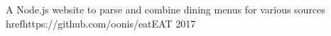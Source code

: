 
\begin{cventries}
    \cventry
    {A Node.js website to parse and combine dining menus for various sources}
    {href{https://github.com/oonis/eat}{EAT}}
    {}
    {2017}
    {
    }
\end{cventries}
